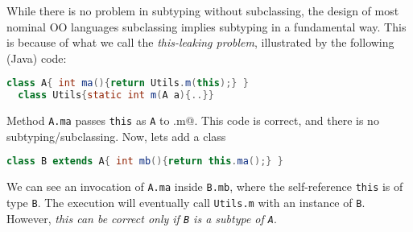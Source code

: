 While there is no problem in subtyping without subclassing, the design
of most nominal OO languages subclassing implies subtyping in a
fundamental way. This is because of what we call the
\emph{this-leaking problem}, illustrated by the following
(Java) code:

\begin{lstlisting}[language=Java]
  class A{ int ma(){return Utils.m(this);} }
  class Utils{static int m(A a){..}}
\end{lstlisting}

Method \lstinline{A.ma} passes \lstinline{this} as \lstinline{A} to \Q@Utils.m@.
This code is correct, and there is no subtyping/subclassing.  Now, lets add a class \Q@B@

\begin{lstlisting}[language=Java]
  class B extends A{ int mb(){return this.ma();} }  
\end{lstlisting}

\noindent We can see an invocation of \lstinline{A.ma} inside
\lstinline{B.mb}, where the self-reference \lstinline{this} is of type \lstinline{B}. 
The execution will eventually call \lstinline{Utils.m} with an
instance of \lstinline{B}. However, \emph{this can be correct only if \lstinline{B} is a subtype of
\lstinline{A}}. 

%
%



